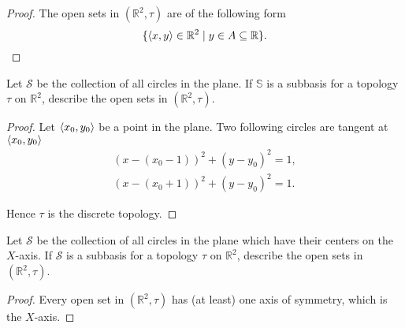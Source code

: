 \begin{proof}
	The open sets in $(\mathbb{R}^{2}, \tau)$ are of the following form
	\[
		\{ \left\langle{x, y}\right\rangle\in\mathbb{R}^{2} \mid y\in A\subseteq\mathbb{R} \}.
	\]
\end{proof}
\newpage

\begin{exercise}
	Let $\mathcal{S}$ be the collection of all circles in the plane. If $\mathbb{S}$ is a subbasis for a topology $\tau$ on $\mathbb{R}^{2}$, describe the open sets in $(\mathbb{R}^{2}, \tau)$.
\end{exercise}

\begin{proof}
	Let $\left\langle{x_{0}, y_{0}}\right\rangle$ be a point in the plane. Two following circles are tangent at $\left\langle{x_{0}, y_{0}}\right\rangle$
	\[
		\begin{split}
			{(x - (x_{0} - 1))}^{2} + {(y - y_{0})}^{2} = 1, \\
			{(x - (x_{0} + 1))}^{2} + {(y - y_{0})}^{2} = 1.
		\end{split}
	\]

	Hence $\tau$ is the discrete topology.
\end{proof}
\newpage

\begin{exercise}
	Let $\mathcal{S}$ be the collection of all circles in the plane which have their centers on the $X$-axis. If $\mathcal{S}$ is a subbasis for a topology $\tau$ on $\mathbb{R}^{2}$, describe the open sets in $(\mathbb{R}^{2}, \tau)$.
\end{exercise}

\begin{proof}
	Every open set in $(\mathbb{R}^{2}, \tau)$ has (at least) one axis of symmetry, which is the $X$-axis.
\end{proof}
\newpage
